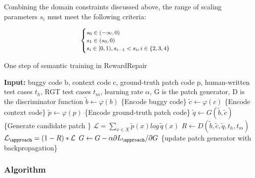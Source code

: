 Combining the domain constraints discussed above, 
the range of scaling parameters $s_{i}$ must meet the following criteria:

\begin{equation}
\footnotesize
\begin{cases}
s_0 \in (-\infty,0) \\
s_1 \in (s_0, 0) \\
s_i \in [0,1),\xspace s_{i-1} < s_{i}, i \in \{2,3,4\} \\
\end{cases}
\label{scale-values}
\end{equation}

  
    
  
   

\begin{algorithm}[t]
\footnotesize
  \caption{One step of semantic training in RewardRepair}
  \begin{algorithmic}[1]
  \STATE \textbf{Input:}  buggy code b, context code c, ground-truth patch code p, human-written test cases $t_h$,
   RGT test cases $t_m$,
  learning rate $\alpha$, G is the \approach patch generator, D is the discriminator function
  \STATE $\widetilde{b} \gets \varphi (b)$ \{Encode buggy code\}\label{algo1:buggycode}
  \STATE $\widetilde{c} \gets \varphi (c)$ \{Encode context code\} \label{algo1:contextcode}
  \STATE $\widetilde{p} \gets \varphi (p)$ \{Encode ground-truth patch code\} \label{algo1:gtcode}
  \STATE $ \widetilde{q} \gets G (\widetilde{b}, \widetilde{c})$ \{Generate candidate patch \}\label{algo1:generate} 
  \STATE $\mathcal{L} =  \sum_{x \in X } \widetilde{p}(x)  log \,  \widetilde{q}(x) $ \label{algo1:celoss}
  \STATE $ R \gets D (\widetilde{b},\widetilde{c},\widetilde{q}, t_h, t_m)$ \label{algo1:discrim}
  \STATE $\mathcal{L}_{\approach}  = (1-R)* \mathcal{L} $ \label{algo1:semanticloss}
  \STATE $G \gets G -  \alpha \partial L_{\approach}/\partial G  $ \{update patch generator with backpropagation\} \label{algo1:updategenerator}
  \end{algorithmic}
  \label{alg:SemanticRewardRepair}
\end{algorithm}

\subsubsection{Algorithm}

